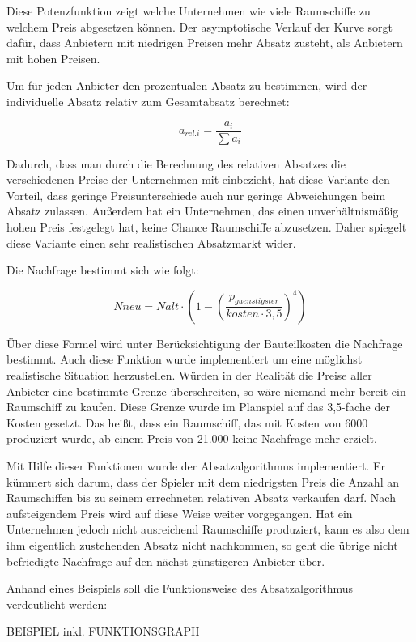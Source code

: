 Diese Potenzfunktion zeigt welche Unternehmen wie viele Raumschiffe zu welchem Preis abgesetzen können. Der asymptotische
Verlauf der Kurve sorgt dafür, dass Anbietern mit niedrigen Preisen mehr Absatz zusteht, als Anbietern mit hohen Preisen.

Um für jeden Anbieter den prozentualen Absatz zu bestimmen, wird der individuelle Absatz relativ zum Gesamtabsatz berechnet:

\begin{equation}
     a_{rel. i} = \frac{a_i}{\sum a_i}
     \label{alg:spielwelt-logik-absatzmengen-2}
\end{equation}

Dadurch, dass man durch die Berechnung des relativen Absatzes die verschiedenen Preise der Unternehmen mit einbezieht, hat
diese Variante den Vorteil, dass geringe Preisunterschiede auch nur geringe Abweichungen beim Absatz zulassen. Außerdem hat
ein Unternehmen, das einen unverhältnismäßig hohen Preis festgelegt hat, keine Chance Raumschiffe abzusetzen. Daher spiegelt
diese Variante einen sehr realistischen Absatzmarkt wider.

Die Nachfrage bestimmt sich wie folgt:

\begin{equation}
     N{neu} = N{alt} \cdot (1 - (\frac{p_{guenstigster}}{kosten \cdot 3,5})^4)
     \label{alg:spielwelt-logik-absatzmengen-3}
\end{equation}

Über diese Formel wird unter Berücksichtigung der Bauteilkosten die Nachfrage bestimmt. Auch diese Funktion wurde implementiert
um eine möglichst realistische Situation herzustellen. Würden in der Realität die Preise aller Anbieter eine bestimmte Grenze
überschreiten, so wäre niemand mehr bereit ein Raumschiff zu kaufen. Diese Grenze wurde im Planspiel auf das 3,5-fache der Kosten
gesetzt. Das heißt, dass ein Raumschiff, das mit Kosten von 6000\curr{} produziert wurde, ab einem Preis von 21.000\curr{} keine
Nachfrage mehr erzielt.

Mit Hilfe dieser Funktionen wurde der Absatzalgorithmus implementiert. Er kümmert sich darum, dass der Spieler mit dem niedrigsten
Preis die Anzahl an Raumschiffen bis zu seinem errechneten relativen Absatz verkaufen darf. Nach aufsteigendem Preis wird auf
diese Weise weiter vorgegangen. Hat ein Unternehmen jedoch nicht ausreichend Raumschiffe produziert, kann es also dem ihm eigentlich
zustehenden Absatz nicht nachkommen, so geht die übrige nicht befriedigte Nachfrage auf den nächst günstigeren Anbieter über.

\bigskip

Anhand eines Beispiels soll die Funktionsweise des Absatzalgorithmus verdeutlicht werden:

BEISPIEL inkl. FUNKTIONSGRAPH